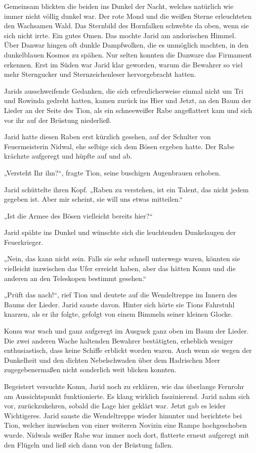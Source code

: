 Gemeinsam blickten die beiden ins Dunkel der Nacht, welches natürlich wie immer nicht völlig dunkel war. Der rote Mond und die weißen Sterne erleuchteten den Wachsamen Wald. Das Sternbild des Hornfalken schwebte da oben, wenn sie sich nicht irrte. Ein gutes Omen. Das mochte Jarid am andorischen Himmel. Über Danwar hingen oft dunkle Dampfwolken, die es unmöglich machten, in den dunkelblauen Kosmos zu spähen. Nur selten konnten die Danware das Firmament erkennen. Erst im Süden war Jarid klar geworden, warum die Bewahrer so viel mehr Sterngucker und Sternzeichenleser hervorgebracht hatten.

Jarids ausschweifende Gedanken, die sich erfreulicherweise einmal nicht um Tri und Rowinda gedreht hatten, kamen zurück ins Hier und Jetzt, an den Baum der Lieder an der Seite des Tion, als ein schneeweißer Rabe angeflattert kam und sich vor ihr auf der Brüstung niederließ.

Jarid hatte diesen Raben erst kürzlich gesehen, auf der Schulter von Feuermeisterin Nidwal, ehe selbige sich dem Bösen ergeben hatte. Der Rabe krächzte aufgeregt und hüpfte auf und ab.

„Versteht Ihr ihn?“, fragte Tion, seine buschigen Augenbrauen erhoben.

Jarid schüttelte ihren Kopf. „Raben zu verstehen, ist ein Talent, das nicht jedem gegeben ist. Aber mir scheint, sie will uns etwas mitteilen.“

„Ist die Armee des Bösen vielleicht bereits hier?“

Jarid spähte ins Dunkel und wünschte sich die leuchtenden Dunkelaugen der Feuerkrieger.

„Nein, das kann nicht sein. Falls sie sehr schnell unterwegs waren, könnten sie vielleicht inzwischen das Ufer erreicht haben, aber das hätten Komu und die anderen an den Teleskopen bestimmt gesehen.“

„Prüft das nach!“, rief Tion und deutete auf die Wendeltreppe im Innern des Baums der Lieder. Jarid sauste davon. Hinter sich hörte sie Tions Fahrstuhl knarzen, als er ihr folgte, gefolgt von einem Bimmeln seiner kleinen Glocke.

Komu war wach und ganz aufgeregt im Ausguck ganz oben im Baum der Lieder. Die zwei anderen Wache haltenden Bewahrer bestätigten, erheblich weniger enthusiastisch, dass keine Schiffe erblickt worden waren. Auch wenn sie wegen der Dunkelheit und den dichten Nebelschwaden über dem Hadrischen Meer zugegebenermaßen nicht sonderlich weit blicken konnten.

Begeistert versuchte Komu, Jarid noch zu erklären, wie das überlange Fernrohr am Aussichtspunkt funktionierte. Es klang wirklich faszinierend. Jarid nahm sich vor, zurückzukehren, sobald die Lage hier geklärt war. Jetzt gab es leider Wichtigeres. Jarid sauste die Wendeltreppe wieder hinunter und berichtete bei Tion, welcher inzwischen von einer weiteren Novizin eine Rampe hochgeschoben wurde. Nidwals weißer Rabe war immer noch dort, flatterte erneut aufgeregt mit den Flügeln und ließ sich dann von der Brüstung fallen.

